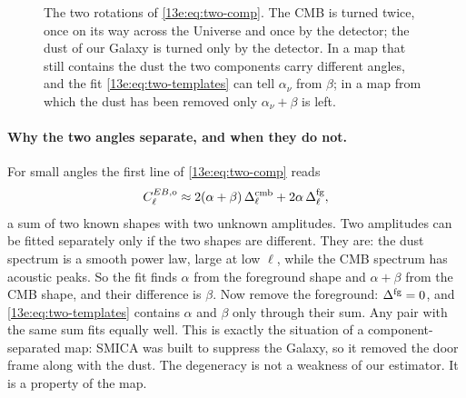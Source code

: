 \begin{figure}[htbp]
\centering
{}
\caption{The two rotations of \eqref{13e:eq:two-comp}. The CMB is turned twice, once on its way across the
Universe and once by the detector; the dust of our Galaxy is turned only by the detector. In a map that still
contains the dust the two components carry different angles, and the fit \eqref{13e:eq:two-templates} can tell
$\alpha_\nu$ from $\beta$; in a map from which the dust has been removed only $\alpha_\nu+\beta$ is left.}
\label{13e:fig:tworot}
\end{figure}

\paragraph{Why the two angles separate, and when they do not.} For small angles the first line of
\eqref{13e:eq:two-comp} reads
\begin{equation}
  C^{EB,{\rm o}}_\ell\approx2(\alpha+\beta)\,\Delta^{\rm cmb}_\ell+2\alpha\,\Delta^{\rm fg}_\ell ,
  \label{13e:eq:two-templates}
\end{equation}
a sum of two known shapes with two unknown amplitudes. Two amplitudes can be fitted separately only if the
two shapes are different. They are: the dust spectrum is a smooth power law, large at low $\ell$, while the
CMB spectrum has acoustic peaks. So the fit finds $\alpha$ from the foreground shape and $\alpha+\beta$ from the
CMB shape, and their difference is $\beta$. Now remove the foreground: $\Delta^{\rm fg}=0$, and
\eqref{13e:eq:two-templates} contains $\alpha$ and $\beta$ only through their sum. Any pair with the same sum fits
equally well. This is exactly the situation of a component-separated map: SMICA was built to suppress the
Galaxy, so it removed the door frame along with the dust. The degeneracy is not a weakness of our estimator.
It is a property of the map.

